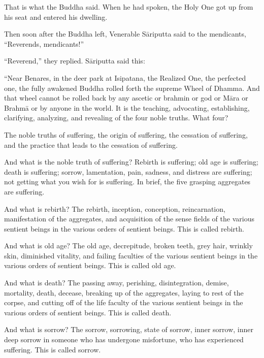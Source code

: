 \documentclass[12pt,openany]{book}%
\begin{document}
That is what the Buddha said. When he had spoken, the Holy One got up from his seat and entered his dwelling. 

Then soon after the Buddha left, Venerable \textsanskrit{Sāriputta} said to the mendicants, “Reverends, mendicants!” 

“Reverend,” they replied. \textsanskrit{Sāriputta} said this: 

“Near Benares, in the deer park at Isipatana, the Realized One, the perfected one, the fully awakened Buddha rolled forth the supreme Wheel of Dhamma. And that wheel cannot be rolled back by any ascetic or brahmin or god or \textsanskrit{Māra} or \textsanskrit{Brahmā} or by anyone in the world. It is the teaching, advocating, establishing, clarifying, analyzing, and revealing of the four noble truths. What four? 

The noble truths of suffering, the origin of suffering, the cessation of suffering, and the practice that leads to the cessation of suffering. 

And what is the noble truth of suffering? Rebirth is suffering; old age is suffering; death is suffering; sorrow, lamentation, pain, sadness, and distress are suffering; not getting what you wish for is suffering. In brief, the five grasping aggregates are suffering. 

And what is rebirth? The rebirth, inception, conception, reincarnation, manifestation of the aggregates, and acquisition of the sense fields of the various sentient beings in the various orders of sentient beings. This is called rebirth. 

And what is old age? The old age, decrepitude, broken teeth, grey hair, wrinkly skin, diminished vitality, and failing faculties of the various sentient beings in the various orders of sentient beings. This is called old age. 

And what is death? The passing away, perishing, disintegration, demise, mortality, death, decease, breaking up of the aggregates, laying to rest of the corpse, and cutting off of the life faculty of the various sentient beings in the various orders of sentient beings. This is called death. 

And what is sorrow? The sorrow, sorrowing, state of sorrow, inner sorrow, inner deep sorrow in someone who has undergone misfortune, who has experienced suffering. This is called sorrow. 
\end{document}
